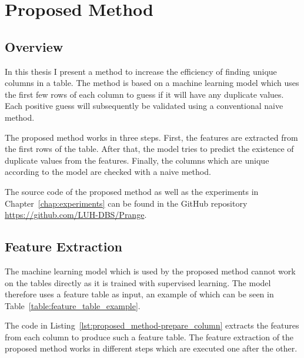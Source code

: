 \chapter{Proposed Method}\label{chap:proposed_method}
\section{Overview}\label{sec:overview}
In this thesis I present a method to increase the efficiency of finding unique columns in a table. The method is based on a machine learning model which uses the first few rows of each column to guess if it will have any duplicate values. Each positive guess will subsequently be validated using a conventional naive method.

The proposed method works in three steps. First, the features are extracted from the first rows of the table. After that, the model tries to predict the existence of duplicate values from the features. Finally, the columns which are unique according to the model are checked with a naive method.

The source code of the proposed method as well as the experiments in Chapter~\ref{chap:experiments} can be found in the GitHub repository \url{https://github.com/LUH-DBS/Prange}.

\section{Feature Extraction}\label{sec:extracted_features}
The machine learning model which is used by the proposed method cannot work on the tables directly as it is trained with supervised learning. The model therefore uses a feature table as input, an example of which can be seen in Table~\ref{table:feature_table_example}.




The code in Listing~\ref{lst:proposed_method-prepare_column} extracts the features from each column to produce such a feature table. The feature extraction of the proposed method works in different steps which are executed one after the other.

